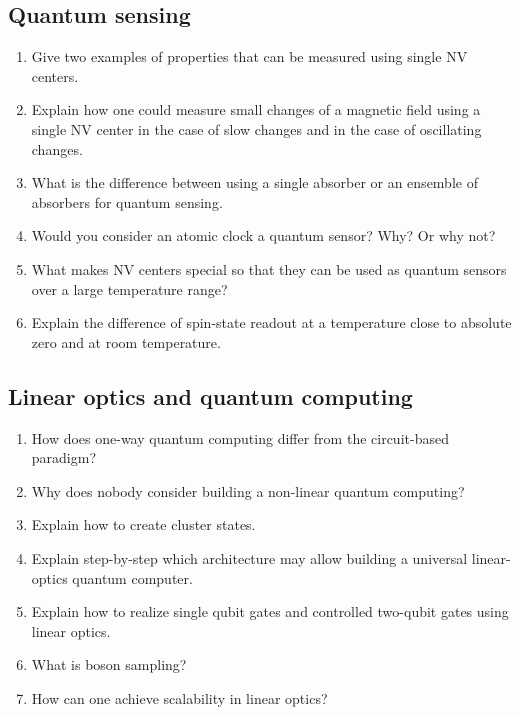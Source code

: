 \documentclass[a4paper]{scrartcl}
\newcommand{\qa}[2]{#1\\ \textit{#2}}
\begin{document}
\subsection*{Quantum sensing}
\begin{enumerate}[label=(\alph*)]
  \item \qa{Give two examples of properties that can be measured using single NV
  centers.}{}
  \item \qa{Explain how one could measure small changes of a magnetic field using a single NV center in the case of slow changes and in the case of oscillating changes.}{}
  \item \qa{What is the difference between using a single absorber or an ensemble of absorbers for quantum sensing.}{}
  \item \qa{Would you consider an atomic clock a quantum sensor? Why? Or why not?}{}
  \item \qa{What makes NV centers special so that they can be used as quantum sensors over a large temperature range?}{}
  \item \qa{Explain the difference of spin-state readout at a temperature close to absolute zero and at room temperature.}{}
\end{enumerate}

\subsection*{Linear optics and quantum computing}
\begin{enumerate}[label=(\alph*)]
  \item \qa{How does one-way quantum computing differ from the circuit-based paradigm?}{}
  \item \qa{Why does nobody consider building a non-linear quantum computing?}{}
  \item \qa{Explain how to create cluster states.}{}
  \item \qa{Explain step-by-step which architecture may allow building a universal linear-optics quantum computer.}{}
  \item \qa{Explain how to realize single qubit gates and controlled two-qubit gates using linear optics.}{}
  \item \qa{What is boson sampling?}{}
  \item \qa{How can one achieve scalability in linear optics?}{}
\end{enumerate}
\end{document}
